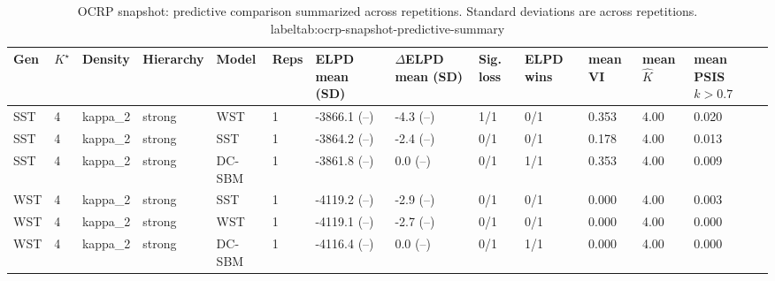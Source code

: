 \begin{table}[!h]
\centering
\caption{OCRP snapshot: predictive comparison summarized across repetitions. Standard deviations are across repetitions.\\label{tab:ocrp-snapshot-predictive-summary}}
\centering
\begin{tabular}[t]{lllllllllllll}
\toprule
Gen & $K^\star$ & Density & Hierarchy & Model & Reps & ELPD mean (SD) & $\Delta$ELPD mean (SD) & Sig. loss & ELPD wins & mean VI & mean $\hat K$ & mean PSIS $k>0.7$\\
\midrule
SST & 4 & kappa_2 & strong & WST & 1 & -3866.1 (--) & -4.3 (--) & 1/1 & 0/1 & 0.353 & 4.00 & 0.020\\
SST & 4 & kappa_2 & strong & SST & 1 & -3864.2 (--) & -2.4 (--) & 0/1 & 0/1 & 0.178 & 4.00 & 0.013\\
SST & 4 & kappa_2 & strong & DC-SBM & 1 & -3861.8 (--) & 0.0 (--) & 0/1 & 1/1 & 0.353 & 4.00 & 0.009\\
WST & 4 & kappa_2 & strong & SST & 1 & -4119.2 (--) & -2.9 (--) & 0/1 & 0/1 & 0.000 & 4.00 & 0.003\\
WST & 4 & kappa_2 & strong & WST & 1 & -4119.1 (--) & -2.7 (--) & 0/1 & 0/1 & 0.000 & 4.00 & 0.000\\
WST & 4 & kappa_2 & strong & DC-SBM & 1 & -4116.4 (--) & 0.0 (--) & 0/1 & 1/1 & 0.000 & 4.00 & 0.000\\
\bottomrule
\end{tabular}
\end{table}
